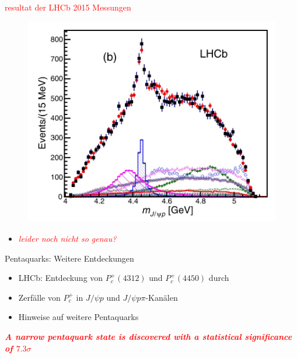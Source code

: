\documentclass[aspectratio=169]{beamer} %
\begin{document}
    \begin{frame}{\textcolor{red}{resultat der LHCb 2015 Messungen}}
      \begin{figure}\includegraphics[width=\textwidth, height=0.6\textheight, keepaspectratio]{Images/f4773e9d-39b6-4dc8-8301-4f91e5c718c3.jpg}%
        \\\protect\cite[S.~2]{Aaij.2015}\end{figure}
      \begin{itemize}
        \item \emph{\textcolor{red}{leider noch nicht so genau?}}
      \end{itemize}
    \end{frame}

    \begin{frame}{Pentaquarks: Weitere Entdeckungen}
      \begin{itemize}
        \item LHCb: Entdeckung von $P_c^+(4312)$ und $P_c^+(4450)$ durch \textcite{Aaij.2019}
        \item Zerfälle von $P_c^+$ in $J/\psi p$ und $J/\psi p\pi$-Kanälen
        \item Hinweise auf weitere Pentaquarks
      \end{itemize}
      \emph{\textcolor{red}{\textbf{A narrow pentaquark state is discovered with a statistical significance of $7.3\sigma$
            }}}
    \end{frame}
\end{document}
